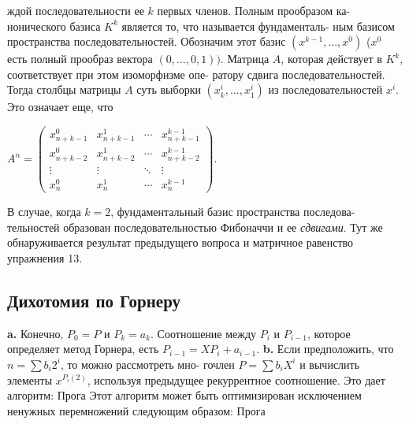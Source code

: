 \documentclass{mai_book}
\begin{document}
ждой последовательности ее $k$ первых членов. Полным прообразом ка-
нонического базиса $K^k$ является то, что называется фундаменталь-
ным базисом пространства последовательностей. Обозначим этот базис
$(x^{k-1},...,x^0)$ ($x^0$ есть полный прообраз вектора $(0,...,0,1))$. Матрица
$A$, которая действует в $K^k$, соответствует при этом изоморфизме опе-
ратору сдвига последовательностей. Тогда столбцы матрицы $A$ суть
выборки $(x_k^i,...,x_1^i)$ из последовательностей $x^i$. Это означает еще, что
\begin{center}
$A^n=\begin{pmatrix}
x_{n+k-1}^0 & x_{n+k-1}^1 & \cdots & x_{n+k-1}^{k-1} \\
x_{n+k-2}^0 & x_{n+k-2}^1 & \cdots & x_{n+k-2}^{k-1} \\         
\vdots & \vdots & \ddots & \vdots \\
x_n^0 & x_n^1 & \cdots & x_n^{k-1}
\end{pmatrix}$.
\end{center}
В случае, когда $k=2$, фундаментальный базис пространства последова-
тельностей образован последовательностью Фибоначчи и ее \textit{сдвигами}.
Тут же обнаруживается результат предыдущего вопроса и матричное
равенство упражнения 13.\newline
\subsection{Дихотомия по Горнеру}
\hspace*{15pt}\textbf{a.} Конечно, $P_0=P$ и $P_k=a_k$. Соотношение между $P_i$ и $P_{i-1}$,
которое определяет метод Горнера, есть $P_{i-1}=X P_i+a_{i-1}$.\newline
\hspace*{15pt}\textbf{b.} Если предположить, что $n=\sum b_i2^i$, то можно рассмотреть мно-
гочлен $P=\sum b_iX^i$ и вычислить элементы $x^{P_i(2)}$, используя предыдущее
рекуррентное соотношение. Это дает алгоритм:\newline
Прога\newline
Этот алгоритм может быть оптимизирован исключением ненужных
перемножений следующим образом:\newline
Прога
\newpage
\end{document}
